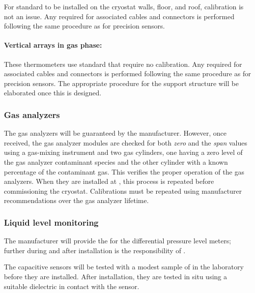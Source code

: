 For standard  to be installed on the cryostat walls, floor, and roof, calibration is not an issue. Any  required for associated cables and connectors %
is performed following the same procedure as for precision sensors. 


\paragraph{Vertical arrays in gas phase:}
\label{sec:fdgen-slow-cryo-qc-gs}

These thermometers use standard  that require no calibration.  Any  required for associated cables and connectors is performed following the same procedure as for precision sensors. The appropriate  procedure for the  support structure will be elaborated once this is designed.  


\subsubsection{Gas analyzers}
\label{sec:fdgen-slow-cryo-qc-ga}


The gas analyzers will be guaranteed by the manufacturer. However, once received, the gas analyzer modules %
are checked for both \textit{zero} and the \textit{span} values using a gas-mixing instrument and two gas cylinders, one having a zero level of the gas analyzer contaminant species and the other cylinder with a known percentage of the contaminant gas. This %
 verifies the proper operation of the gas analyzers. When they are installed at \surf, this process %
 is repeated before commissioning the cryostat. Calibrations must be repeated %
 using manufacturer recommendations over the gas analyzer lifetime.


\subsubsection{Liquid level monitoring}
\label{sec:fdgen-slow-cryo-qc-llm}

The manufacturer will provide the  for the differential pressure level meters; further  during and after installation %
is the responsibility of .

The capacitive sensors will be tested with a modest sample of \lar in the laboratory before they are installed. After installation, they are tested in situ %
using a suitable dielectric in contact with the sensor.

